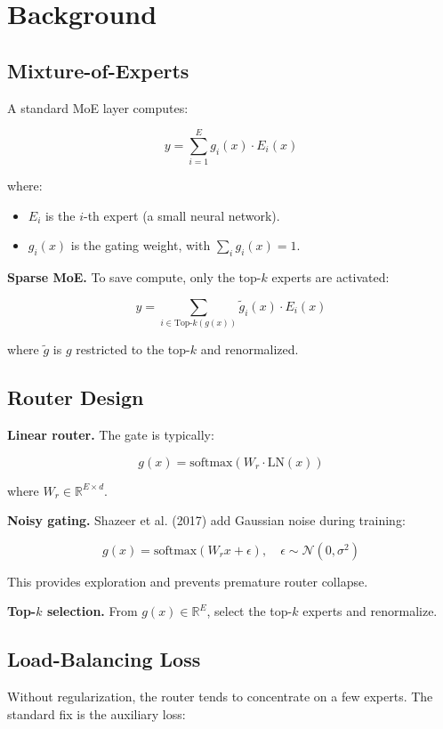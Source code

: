 \section{Background}

\subsection{Mixture-of-Experts}

A standard MoE layer computes:

\[
y = \sum_{i=1}^{E} g_i(x) \cdot E_i(x)
\tag{3.1}
\]

where:
\begin{itemize}
\item $E_i$ is the $i$-th expert (a small neural network).
\item $g_i(x)$ is the gating weight, with $\sum_i g_i(x) = 1$.

\end{itemize}
\textbf{Sparse MoE.} To save compute, only the top-$k$ experts are activated:

\[
y = \sum_{i \in \text{Top-}k(g(x))} \tilde{g}_i(x) \cdot E_i(x)
\tag{3.2}
\]

where $\tilde{g}$ is $g$ restricted to the top-$k$ and renormalized.

\subsection{Router Design}

\textbf{Linear router.} The gate is typically:

\[
g(x) = \text{softmax}(W_r \cdot \text{LN}(x))
\tag{3.3}
\]

where $W_r \in \mathbb{R}^{E \times d}$.

\textbf{Noisy gating.} Shazeer et al. (2017) add Gaussian noise during training:

\[
g(x) = \text{softmax}(W_r x + \epsilon), \quad \epsilon \sim \mathcal{N}(0, \sigma^2)
\tag{3.4}
\]

This provides exploration and prevents premature router collapse.

\textbf{Top-$k$ selection.} From $g(x) \in \mathbb{R}^E$, select the top-$k$ experts 
and renormalize.

\subsection{Load-Balancing Loss}

Without regularization, the router tends to concentrate on a few experts. 
The standard fix is the auxiliary loss:

